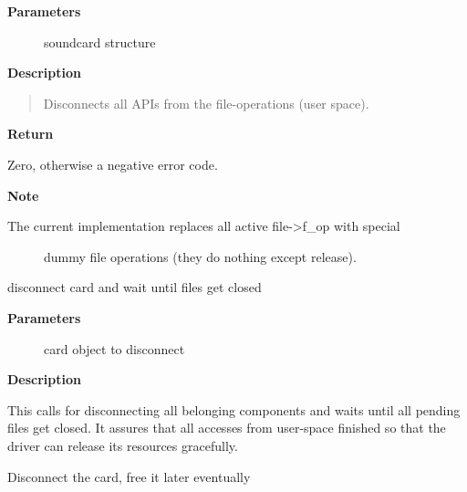 \documentclass[a4paper,8pt,english]{sphinxmanual}
\begin{document}
\textbf{Parameters}
\begin{description}
\item[{}] \leavevmode
soundcard structure

\end{description}

\textbf{Description}
\begin{quote}

Disconnects all APIs from the file-operations (user space).
\end{quote}

\textbf{Return}

Zero, otherwise a negative error code.

\textbf{Note}
\begin{description}
\item[{The current implementation replaces all active file-\textgreater{}f\_op with special}] \leavevmode
dummy file operations (they do nothing except release).

\end{description}

\begin{fulllineitems}
\label{sound/kernel-api/alsa-driver-api:c.snd_card_disconnect_sync}
disconnect card and wait until files get closed

\end{fulllineitems}


\textbf{Parameters}
\begin{description}
\item[{}] \leavevmode
card object to disconnect

\end{description}

\textbf{Description}

This calls  for disconnecting all belonging components
and waits until all pending files get closed.
It assures that all accesses from user-space finished so that the driver
can release its resources gracefully.

\begin{fulllineitems}
\label{sound/kernel-api/alsa-driver-api:c.snd_card_free_when_closed}
Disconnect the card, free it later eventually

\end{fulllineitems}
\end{document}
